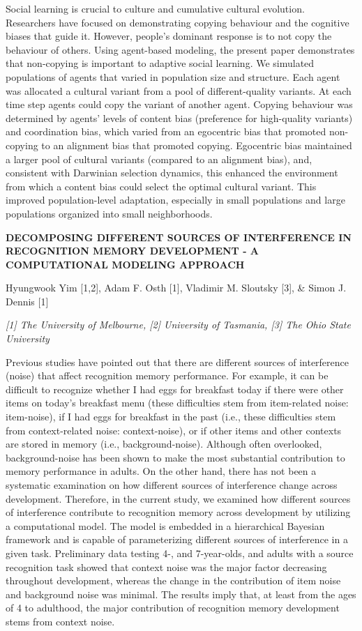 \documentclass[]{article}
\begin{document}
Social learning is crucial to culture and cumulative cultural evolution.
Researchers have focused on demonstrating copying behaviour and the
cognitive biases that guide it. However, people's dominant response is
to not copy the behaviour of others. Using agent-based modeling, the
present paper demonstrates that non-copying is important to adaptive
social learning. We simulated populations of agents that varied in
population size and structure. Each agent was allocated a cultural
variant from a pool of different-quality variants. At each time step
agents could copy the variant of another agent. Copying behaviour was
determined by agents' levels of content bias (preference for
high-quality variants) and coordination bias, which varied from an
egocentric bias that promoted non-copying to an alignment bias that
promoted copying. Egocentric bias maintained a larger pool of cultural
variants (compared to an alignment bias), and, consistent with Darwinian
selection dynamics, this enhanced the environment from which a content
bias could select the optimal cultural variant. This improved
population-level adaptation, especially in small populations and large
populations organized into small neighborhoods.

\textbf{DECOMPOSING DIFFERENT SOURCES OF INTERFERENCE IN RECOGNITION
MEMORY DEVELOPMENT - A COMPUTATIONAL MODELING APPROACH}

Hyungwook Yim {[}1,2{]}, Adam F. Osth {[}1{]}, Vladimir M. Sloutsky
{[}3{]}, \& Simon J. Dennis {[}1{]}

\emph{{[}1{]} The University of Melbourne, {[}2{]} University of
Tasmania, {[}3{]} The Ohio State University}

Previous studies have pointed out that there are different sources of
interference (noise) that affect recognition memory performance. For
example, it can be difficult to recognize whether I had eggs for
breakfast today if there were other items on today's breakfast menu
(these difficulties stem from item-related noise: item-noise), if I had
eggs for breakfast in the past (i.e., these difficulties stem from
context-related noise: context-noise), or if other items and other
contexts are stored in memory (i.e., background-noise). Although often
overlooked, background-noise has been shown to make the most substantial
contribution to memory performance in adults. On the other hand, there
has not been a systematic examination on how different sources of
interference change across development. Therefore, in the current study,
we examined how different sources of interference contribute to
recognition memory across development by utilizing a computational
model. The model is embedded in a hierarchical Bayesian framework and is
capable of parameterizing different sources of interference in a given
task. Preliminary data testing 4-, and 7-year-olds, and adults with a
source recognition task showed that context noise was the major factor
decreasing throughout development, whereas the change in the
contribution of item noise and background noise was minimal. The results
imply that, at least from the ages of 4 to adulthood, the major
contribution of recognition memory development stems from context noise.
\end{document}
